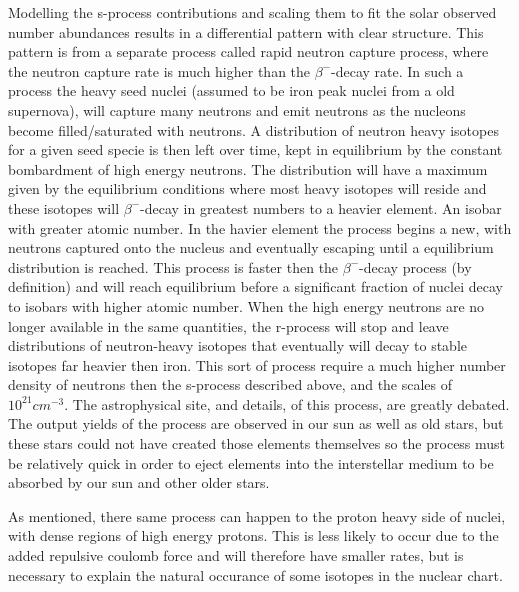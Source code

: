 Modelling the s-process contributions and scaling them to fit the solar observed number abundances results in a differential pattern with clear structure.
This pattern is from a separate process called rapid neutron capture process, where the neutron capture rate is much higher than the $\beta^-$-decay rate. In such a process the heavy seed nuclei (assumed to be iron peak nuclei from a old supernova), will capture many neutrons and emit neutrons as the nucleons become filled/saturated with neutrons. A distribution of neutron heavy isotopes for a given seed specie is then left over time, kept in equilibrium by the constant bombardment of high energy neutrons. The distribution will have a maximum given by the equilibrium conditions where most heavy isotopes will reside and these isotopes will $\beta^-$-decay in greatest numbers to a heavier element. An isobar with greater atomic number.
In the havier element the process begins a new, with neutrons captured onto the nucleus and eventually escaping until a equilibrium distribution is reached. This process is faster then the $\beta^-$-decay process (by definition) and will reach equilibrium before a significant fraction of nuclei decay to isobars with higher atomic number.
When the high energy neutrons are no longer available in the same quantities, the r-process will stop and leave distributions of neutron-heavy isotopes that eventually will decay to stable isotopes far heavier then iron.
This sort of process require a much higher number density of neutrons then the s-process described above, and the scales of $10^{21} cm^{-3}$.
The astrophysical site, and details, of this process, are greatly debated. The output yields of the process are observed in our sun as well as old stars, but these stars could not have created those elements themselves so the process must be relatively quick in order to eject elements into the interstellar medium to be absorbed by our sun and other older stars.

As mentioned, there same process can happen to the proton heavy side of nuclei, with dense regions of high energy protons. This is less likely to occur due to the added repulsive coulomb force and will therefore have smaller rates, but is necessary to explain the natural occurance of some isotopes in the nuclear chart.

